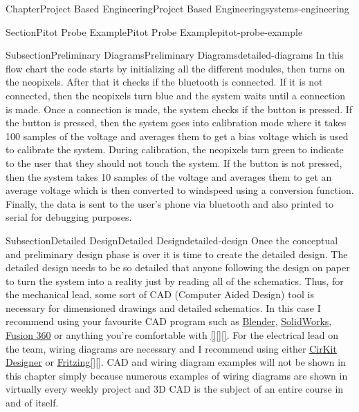 \documentclass[oneside,10pt,]{book}
\newcommand{\xreffont}{\relax}
\newcommand{\linkhilite}[1]{\underline{#1}}
\numberwithin{equation}{section}
\begin{document}
\begin{chapterptx}{Chapter}{Project Based Engineering}{}{Project Based Engineering}{}{}{systems-engineering}
\begin{sectionptx}{Section}{Pitot Probe Example}{}{Pitot Probe Example}{}{}{pitot-probe-example}
\begin{subsectionptx}{Subsection}{Preliminary Diagrams}{}{Preliminary Diagrams}{}{}{detailed-diagrams}
 In this flow chart the code starts by initializing all the different modules, then turns on the neopixels. After that it checks if the bluetooth is connected. If it is not connected, then the neopixels turn blue and the system waits until a connection is made. Once a connection is made, the system checks if the button is pressed. If the button is pressed, then the system goes into calibration mode where it takes 100 samples of the voltage and averages them to get a bias voltage which is used to calibrate the system. During calibration, the neopixels turn green to indicate to the user that they should not touch the system. If the button is not pressed, then the system takes 10 samples of the voltage and averages them to get an average voltage which is then converted to windspeed using a conversion function. Finally, the data is sent to the user's phone via bluetooth and also printed to serial for debugging purposes.%
\end{subsectionptx}
%
%
\typeout{************************************************}
\typeout{************************************************}
%
\begin{subsectionptx}{Subsection}{Detailed Design}{}{Detailed Design}{}{}{detailed-design}
Once the conceptual and preliminary design phase is over it is time to create the detailed design. The detailed design needs to be so detailed that anyone following the design on paper to turn the system into a reality just by reading all of the schematics. Thus, for the mechanical lead, some sort of CAD (Computer Aided Design) tool is necessary for dimensioned drawings and detailed schematics. In this case I recommend using your favourite CAD program such as \href{https://www.blender.org/}{\linkhilite{Blender}}, \href{https://www.solidworks.com/}{\linkhilite{SolidWorks}}, \href{https://www.autodesk.com/products/fusion-360}{\linkhilite{Fusion 360}} or anything you're comfortable with \hyperlink{blender}{\linkhilite{[{\xreffont 5}]}}\hyperlink{solidworks}{\linkhilite{[{\xreffont 7}]}}\hyperlink{autodesk}{\linkhilite{[{\xreffont 8}]}}. For the electrical lead on the team, wiring diagrams are necessary and I recommend using either \href{https://app.cirkitdesigner.com/}{\linkhilite{CirKit Designer}} or \href{https://fritzing.org/}{\linkhilite{Fritzing}}\hyperlink{cirkit}{\linkhilite{[{\xreffont 9}]}}\hyperlink{fritzing}{\linkhilite{[{\xreffont 6}]}}. CAD and wiring diagram examples will not be shown in this chapter simply because numerous examples of wiring diagrams are shown in virtually every weekly project and 3D CAD is the subject of an entire course in and of itself.%

\end{subsectionptx}
\end{sectionptx}
\end{chapterptx}
\end{document}

